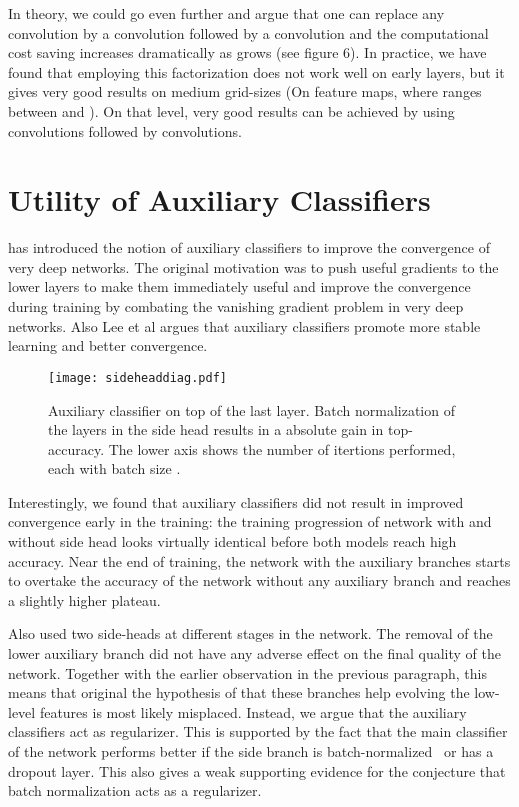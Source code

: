 \documentclass[10pt,twocolumn,letterpaper]{article}
\begin{document}
In theory, we could go even further and argue that one can
replace any  convolution by a  convolution followed
by a  convolution and the computational cost saving increases
dramatically as  grows (see figure 6). In practice, we have found that employing this
factorization does not work well on early layers, but it gives very good results
on medium grid-sizes (On  feature maps, where  ranges between 
and ). On that level, very good results can be achieved by using
 convolutions followed by  convolutions.
 \section{Utility of Auxiliary Classifiers}

\cite{szegedy2015going} has introduced the notion of auxiliary classifiers
to improve the convergence of very deep networks. The original motivation was
to push useful gradients to the lower layers to make them immediately
useful and improve the convergence during training by combating the
vanishing gradient problem in very deep networks. Also Lee et al\cite{lee2014deeply}
argues that auxiliary classifiers promote more stable learning and better
convergence.
\begin{figure}
\centering
\texttt{[image: sideheaddiag.pdf]}
\caption{Auxiliary classifier on top of the last  layer.
Batch normalization\cite{ioffe2015batch} of the layers in the side head
results in a  absolute gain in top- accuracy. The lower axis shows
the number of itertions performed, each with batch size .}
\label{fig:sidehead}
\end{figure}
Interestingly, we found that auxiliary classifiers did not result in improved
convergence early in the training: the training progression of network with
and without side head looks virtually identical before both models reach
high accuracy. Near the end of training, 
the network with the auxiliary branches starts to
overtake the accuracy of the network without any auxiliary branch and
reaches a slightly higher plateau.

Also \cite{szegedy2015going} used two side-heads at different stages in the
network. The removal of the lower auxiliary branch did not have any
adverse effect on the final quality of the network. Together with the
earlier observation in the previous paragraph, this means that
original the hypothesis of \cite{szegedy2015going} that these branches
help evolving the low-level features is most likely misplaced.
Instead, we argue that the auxiliary classifiers act as regularizer.
This is supported by the fact that the main classifier of the
network  performs better if the side branch is batch-normalized~\cite{ioffe2015batch}
or has a dropout layer. This also gives a weak supporting evidence for the
conjecture that batch normalization acts as a regularizer.
\end{document}
